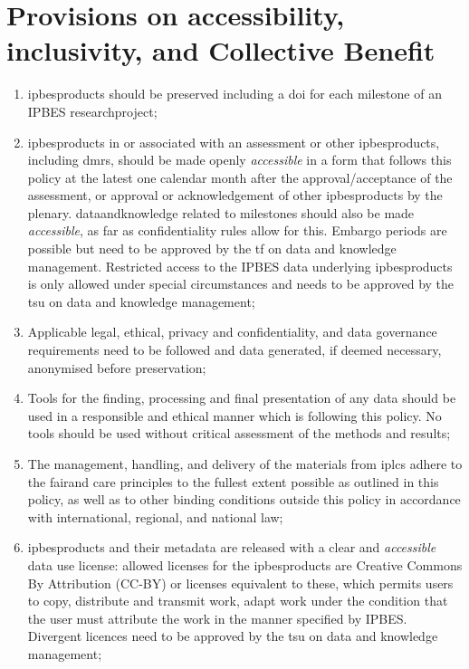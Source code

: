 \documentclass{article}
\begin{document}
\section{Provisions on accessibility, inclusivity, and Collective Benefit}

\begin{enumerate}[label=(\alph*)]
    \item \glspl{ipbesproduct} should be preserved including a \gls{doi} for each \gls{milestone} of an IPBES \gls{researchproject};

    \item \glspl{ipbesproduct} in or associated with an assessment or other \glspl{ipbesproduct}, including \glspl{dmr}, should be made openly \textit{accessible} in a form that follows this policy at the latest one calendar month after the approval/acceptance of the assessment, or approval or acknowledgement of other \glspl{ipbesproduct} by the \gls{plenary}. \gls{dataandknowledge} related to \glspl{milestone} should also be made \textit{accessible}, as far as confidentiality rules allow for this. Embargo periods are possible but need to be approved by the \gls{tf} on data and knowledge management. Restricted access to the IPBES \gls{data} underlying \glspl{ipbesproduct} is only allowed under special circumstances and needs to be approved by the  \gls{tsu} on \gls{data} and \gls{knowledge} management;

    \item Applicable legal, ethical, privacy and confidentiality, and \gls{data} governance requirements need to be followed and \gls{data} generated, if deemed necessary, anonymised before preservation;

    \item Tools for the finding, processing and final presentation of any \gls{data} should be used in a responsible and ethical manner which is following this policy. No tools should be used without critical assessment of the methods and results;

    \item The management, handling, and delivery of the materials from \glspl{iplc} adhere to the \gls{fair}and \gls{care} principles to the fullest extent possible as outlined in this policy, as well as to other binding conditions outside this policy in accordance with international, regional, and national law;

    \item \glspl{ipbesproduct} and their metadata are released with a clear and \textit{accessible} \gls{data} use license: allowed licenses for the \glspl{ipbesproduct} are Creative Commons By Attribution (CC-BY) or licenses equivalent to these, which permits users to copy, distribute and transmit work, adapt work under the condition that the user must attribute the work in the manner specified by IPBES. Divergent licences need to be approved by the  \gls{tsu} on \gls{data} and \gls{knowledge} management;


\end{enumerate}
\end{document}
